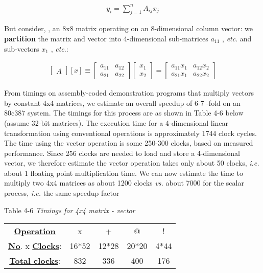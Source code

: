 \begin{align}
    y_{i} = \sum_{j=1}^{n} A_{ij}x_{j}
\end{align}

But consider, \eg, an 8x8 matrix operating on an 8-dimensional column vector: we \textbf{partition} the matrix and vector into 4-dimensional sub-matrices $a_{11}$ , \textit{etc}. and sub-vectors $x_{1}$ , \textit{etc}.:

\begin{align}
    \begin{bmatrix}A\end{bmatrix} [x] \equiv 
    \begin{bmatrix}
      a_{11} & a_{12} \\
      a_{21} & a_{22}
    \end{bmatrix}
    \begin{bmatrix} x_{1} \\ x_{2} \end{bmatrix}
    =
    \begin{bmatrix}
      a_{11}x_{1} & a_{12}x_{2} \\
      a_{21}x_{1} & a_{22}x_{2}
    \end{bmatrix}
\end{align}

From timings on assembly-coded demonstration programs that multiply vectors by constant 4x4 matrices, we estimate an overall speedup of 6-7 -fold on an 80c387 system. The timings for this process are as shown in Table 4-6 below (assume 32-bit  matrices). The execution time for a 4-dimensional linear transformation using conventional operations is approximately 1744 clock cycles. The time using the vector operation is some 250-300 clocks, based on measured performance. Since 256 clocks are needed to load and store a 4-dimensional vector, we therefore estimate the vector operation  takes only about 50 clocks, \textit{i.e.} about 1 floating point multiplication time. We can now estimate the time to multiply two 4x4 matrices as about 1200 clocks \textit{vs.} about 7000 for the scalar process, \textit{i.e.} the same speedup factor

Table 4-6 \textit{Timings for 4x4 matrix - vector}
\begin{center}
    \begin{tabular}{|c c c c c|}
        \hline
        \textbf{\underline{Operation}} & x & + & @ & ! \\
        \textbf{\underline{No}}. x \textbf{\underline{Clocks}}: & 16*52 & 12*28 & 20*20 & 4*44 \\
        \textbf{\underline{Total clocks}}: & 832 & 336 & 400 & 176 \\
        \hline
    \end{tabular}
\end{center}

